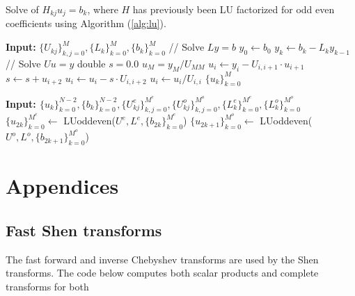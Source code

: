 \documentclass[11pt, oneside]{article}
\begin{document}
\begin{algorithm}
\caption{Solve of $H_{kj}u_j = b_k$, where $H$ has previously been LU factorized for odd even coefficients using Algorithm (\ref{alg:lu}).}
\label{alg:lusolve}
\begin{algorithmic}[1]
  \State \textbf{Input:} $\{U_{kj}\}_{k,j=0}^{M}, \{L_k\}_{k=0}^{M}, \{b_k\}_{k=0}^{M}$ 
  \State // Solve $Ly=b$  
  \State $y_0 \gets b_0$
    \State $y_k \gets b_k - L_ky_{k-1}$
  \EndFor
  \State // Solve $Uu=y$
  \State double $s = 0.0$     
  \State $u_M = y_M / U_{MM}$    
     \State $u_i \gets y_i - U_{i, i+1}\cdot u_{i+1}$
       \State $s \gets s + u_{i+2}$
       \State $u_i \gets u_i - s\cdot U_{i,i+2}$            
     \EndIf
     \State $u_i \gets  u_i / U_{i,i}$
   \EndFor
  \State \Return $\{u_k\}_{k=0}^{M}$  
\EndProcedure
\end{algorithmic}
\begin{algorithmic}[1]
  \State \textbf{Input: $\{u_k\}_{k=0}^{N-2}, \{b_k\}_{k=0}^{N-2}, \{U_{kj}^{e}\}_{k,j=0}^{M^{e}}, \{U_{kj}^{o}\}_{k,j=0}^{M^{o}}, \{L^{e}_k\}_{k=0}^{M^{e}}, \{L^{o}_k\}_{k=0}^{M^{o}}$}
  \State $\{u_{2k}\}_{k=0}^{M^e} \gets $ LUoddeven($U^{e}, L^e, \{b_{2k}\}_{k=0}^{M^e}$)
  \State $\{u_{2k+1}\}_{k=0}^{M^o} \gets $ LUoddeven($U^{o}, L^o, \{b_{2k+1}\}_{k=0}^{M^o}$)
  
\EndProcedure
\end{algorithmic}

\end{algorithm}

\section{Appendices}
\subsection*{Fast Shen transforms}
The fast forward and inverse Chebyshev transforms are used by the Shen transforms. The code below computes both scalar products and complete transforms for both 
\end{document}
